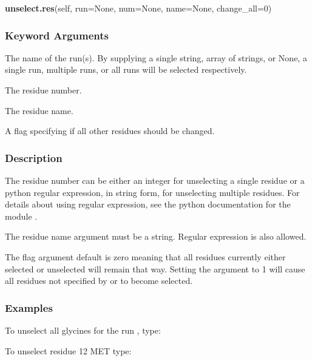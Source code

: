  \textsf{\textbf{unselect.res}(self, run=None, num=None, name=None, change\_all=0)} 

  
 \subsubsection{Keyword Arguments} 

   The name of the run(s).  By supplying a single string, array of strings, or None, a single run, multiple runs, or all runs will be selected respectively.   

   The residue number.   

   The residue name.   

   A flag specifying if all other residues should be changed.  

  

  
 \subsubsection{Description} 

 The residue number can be either an integer for unselecting a single residue or a python regular expression, in string form, for unselecting multiple residues.  For details about using regular expression, see the python documentation for the module . 
  

 The residue name argument must be a string.  Regular expression is also allowed. 
  

 The  flag argument default is zero meaning that all residues currently either selected or unselected will remain that way.  Setting the argument to 1 will cause all residues not specified by  or  to become selected. 
  

  
 \subsubsection{Examples} 

 To unselect all glycines for the run , type: 
  



 To unselect residue 12 MET type: 
  


